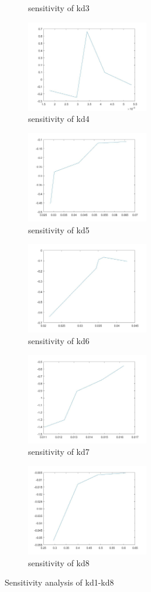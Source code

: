 \begin{figure}[H]
\begin{subfigure}{0.5\textwidth}
		\caption{sensitivity of kd3}
	\end{subfigure}%
	\begin{subfigure}{0.5\textwidth}
		\includegraphics[height=4cm]{sd4.jpg}
		\caption{sensitivity of kd4}
	\end{subfigure}
	\begin{subfigure}{0.5\textwidth}
		\includegraphics[height=4cm]{sd5.jpg}
		\caption{sensitivity of kd5}
	\end{subfigure}%
	\begin{subfigure}{0.5\textwidth}
		\includegraphics[height=4cm]{sd6.jpg}
		\caption{sensitivity of kd6}
	\end{subfigure}
	\begin{subfigure}{0.5\textwidth}
		\includegraphics[height=4cm]{sd7.jpg}
		\caption{sensitivity of kd7}
	\end{subfigure}%
	\begin{subfigure}{0.5\textwidth}
		\includegraphics[height=4cm]{sd8.jpg}
		\caption{sensitivity of kd8}
	\end{subfigure}
	\caption{Sensitivity analysis of kd1-kd8}
\end{figure}
